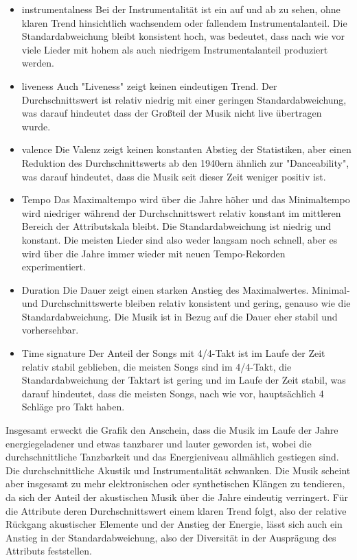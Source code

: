 \documentclass[conference]{IEEEtran}
\begin{document}
\begin{itemize}
\item{instrumentalness} Bei der Instrumentalität ist ein auf und ab zu sehen, ohne klaren Trend hinsichtlich wachsendem oder fallendem Instrumentalanteil. Die Standardabweichung bleibt konsistent hoch, was bedeutet, dass nach wie vor viele Lieder mit hohem als auch niedrigem Instrumentalanteil produziert werden.

\item{liveness} Auch "Liveness" zeigt keinen eindeutigen Trend. Der Durchschnittswert ist relativ niedrig mit einer geringen Standardabweichung, was darauf hindeutet dass der Großteil der Musik nicht live übertragen wurde.

\item{valence} Die Valenz zeigt keinen konstanten Abstieg der Statistiken, aber einen Reduktion des Durchschnittswerts ab den 1940ern ähnlich zur "Danceability", was darauf hindeutet, dass die Musik seit dieser Zeit weniger positiv ist.

\item{Tempo} Das Maximaltempo wird über die Jahre höher und das Minimaltempo wird niedriger während der Durchschnittswert relativ konstant im mittleren Bereich der Attributskala bleibt. Die Standardabweichung ist niedrig und konstant. Die meisten Lieder sind also weder langsam noch schnell, aber es wird über die Jahre immer wieder mit neuen Tempo-Rekorden experimentiert.

\item{Duration} Die Dauer zeigt einen starken Anstieg des Maximalwertes. Minimal- und Durchschnittswerte bleiben relativ konsistent und gering, genauso wie die Standardabweichung. Die Musik ist in Bezug auf die Dauer eher stabil und vorhersehbar.

\item{Time signature} Der Anteil der Songs mit 4/4-Takt ist im Laufe der Zeit relativ stabil geblieben, die meisten Songs sind im 4/4-Takt, die Standardabweichung der Taktart ist gering und im Laufe der Zeit stabil, was darauf hindeutet, dass die meisten Songs, nach wie vor, hauptsächlich 4 Schläge pro Takt haben.
\end{itemize}

Insgesamt erweckt die Grafik den Anschein, dass die Musik im Laufe der Jahre energiegeladener und etwas tanzbarer und lauter geworden ist, wobei die durchschnittliche Tanzbarkeit und das Energieniveau allmählich gestiegen sind. Die durchschnittliche Akustik und Instrumentalität schwanken. Die Musik scheint aber insgesamt zu mehr elektronischen oder synthetischen Klängen zu tendieren, da sich der Anteil der akustischen Musik über die Jahre eindeutig verringert. Für die Attribute deren Durchschnittswert einem klaren Trend folgt, also der relative Rückgang akustischer Elemente und der Anstieg der Energie, lässt sich auch ein Anstieg in der Standardabweichung, also der Diversität in der Ausprägung des Attributs feststellen.
\end{document}
